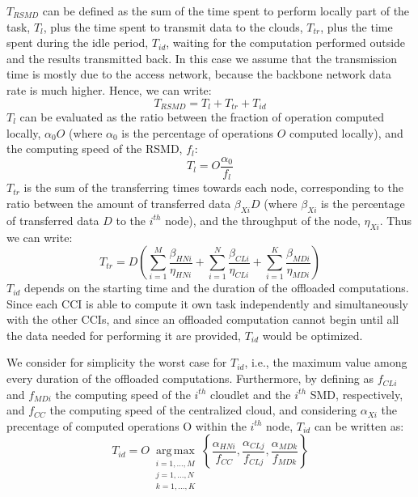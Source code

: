\documentclass[twoside,openright]{report}
\begin{document}
$T_\textit{RSMD}$ can be defined as the sum of the time spent to perform locally part of the task, $T_\textit{l}$, plus the time spent to transmit data to the clouds, $T_\textit{tr}$, plus the time spent during the idle period, $T_\textit{id}$, waiting for the computation performed outside and the results transmitted back. In this case we assume that the transmission time is mostly due to the access network, because the backbone network data rate is much higher. Hence, we can write:
\begin{equation}
\label{eq:latencyRSMD}
T_\textit{RSMD} = T_\textit{l} + T_\textit{tr} +  T_\textit{id} 
\end{equation}
$T_\textit{l}$ can be evaluated as the ratio between the fraction of operation computed locally, $\alpha_0  O$ (where $\alpha_0$ is the percentage of operations $O$ computed locally),  and the computing speed of the \gls{RSMD}, $f_\textit{l}$:
\begin{equation}
\label{eq:Tl}
T_\textit{l}= O \frac{\alpha_0}{f_l} 
\end{equation}
$T_\textit{tr}$ is the sum of the transferring times towards each node, corresponding to the ratio between the amount of transferred data  $\beta_\textit{Xi} D$ (where $\beta_\textit{Xi}$ is the percentage of transferred data $D$ to the $i^{th}$ node),  and the throughput of the node, $\eta_\textit{Xi}$. Thus we can write:
\begin{equation}
\label{eq:Ttr}
T_\textit{tr} =  D  \left (  \sum_{i=1}^\textit{M}\frac{\beta_\textit{HNi}}{\eta_\textit{HNi}}  + \sum_{i=1}^\textit{N}\frac{\beta_\textit{CLi}}{\eta_\textit{CLi}}+ \sum_{i=1}^\textit{K}\frac{\beta_\textit{MDi}}{\eta_\textit{MDi}} \right )
\end{equation}
$T_\textit{id}$ depends on the starting time and the duration of the offloaded computations. Since each \gls{CCI} is able to compute it own task independently and simultaneously with the other \glspl{CCI}, and since an offloaded computation cannot begin until all the data needed for performing it are provided, $T_\textit{id}$ would be optimized.

We consider for simplicity the worst case for $T_\textit{id}$, i.e., the maximum value among every duration of the offloaded computations.
Furthermore, by defining as $f_\textit{CLi}$ and $f_\textit{MDi}$ the computing speed of the $i^{th}$ cloudlet and the $i^{th}$ \gls{SMD}, respectively, and $f_\textit{CC}$ the computing speed of the centralized cloud, and considering $\alpha_\textit{Xi}$ the precentage of computed operations O within the $i^{th}$ node, $T_\textit{id}$ can be written as:
\begin{equation}
\label{eq:Tid}
T_\textit{id} = O \operatorname*{arg\,max}_{\substack{i=1,\ldots,M\\ j=1,\ldots,N\\ k=1,\ldots,K}} \left \{  \frac{\alpha_\textit{HNi}}{f_\textit{CC}} ,  \frac{\alpha_\textit{CLj}}{f_\textit{CLj}} ,   \frac{\alpha_\textit{MDk}}{f_\textit{MDk}} \right \}
\end{equation}
\end{document}
